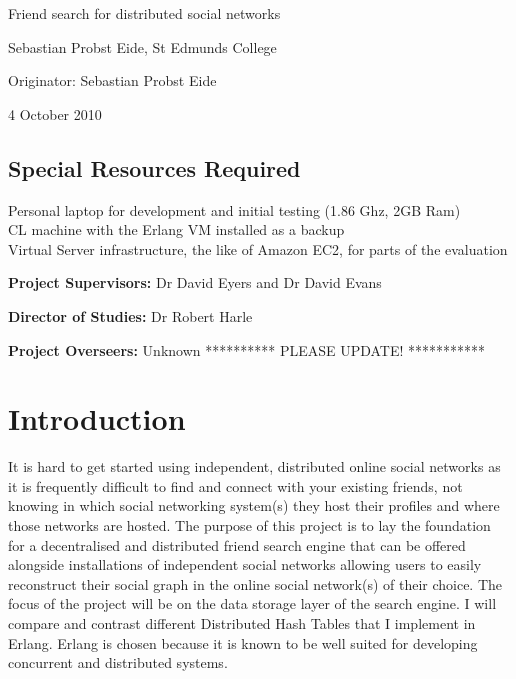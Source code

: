 

\vfil

\centerline{\Large Friend search for distributed social networks }
\vspace{0.4in}
\centerline{\large Sebastian Probst Eide, St Edmunds College }
\vspace{0.3in}
\centerline{\large Originator: Sebastian Probst Eide}
\vspace{0.3in}
\centerline{\large 4 October 2010}

\vfil

\subsection*{Special Resources Required}
Personal laptop for development and initial testing (1.86 Ghz, 2GB Ram) \\
CL machine with the Erlang VM installed as a backup \\
Virtual Server infrastructure, the like of Amazon EC2, for parts of the evaluation \\
\vspace{0.2in}

\noindent
{\bf Project Supervisors:} Dr David Eyers and Dr David Evans
\vspace{0.2in}

\noindent
{\bf Director of Studies:} Dr Robert Harle
\vspace{0.2in}
\noindent
 
\noindent
{\bf Project Overseers:} Unknown ********** PLEASE UPDATE! ***********

\vfil
\pagebreak


\section*{Introduction}

It is hard to get started using independent, distributed online social networks as it is frequently difficult to find and connect with your existing friends, not knowing in which social networking system(s) they host their profiles and where those networks are hosted. The purpose of this project is to lay the foundation for a decentralised and distributed friend search engine that can be offered alongside installations of independent social networks allowing users to easily reconstruct their social graph in the online social network(s) of their choice. The focus of the project will be on the data storage layer of the search engine. I will compare and contrast different Distributed Hash Tables that I implement in Erlang. Erlang is chosen because it is known to be well suited for developing concurrent and distributed systems.

